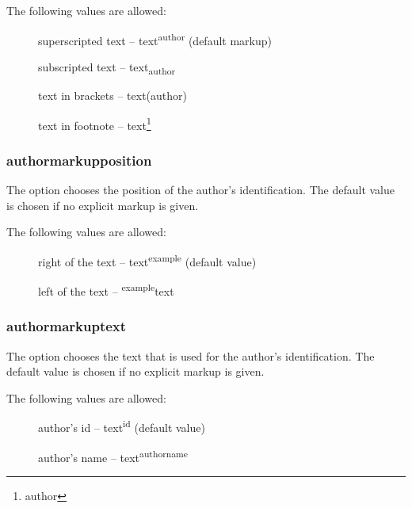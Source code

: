 The following values are allowed:
\begin{description}
	\item [] superscripted text -- text\textsuperscript{author} (default markup)
	\item [] subscripted text -- text\textsubscript{author}
	\item [] text in brackets -- text(author)
	\item [] text in footnote -- text\footnote{author}
\end{description}




\subsubsection{authormarkupposition}

The  option chooses the position of the author's identification.
The default value is chosen if no explicit markup is given.

The following values are allowed:
\begin{description}
	\item [] right of the text -- text\textsuperscript{example} (default value)
	\item [] left of the text -- \textsuperscript{example}text
\end{description}




\subsubsection{authormarkuptext}

The  option chooses the text that is used for the author's identification.
The default value is chosen if no explicit markup is given.

The following values are allowed:
\begin{description}
	\item [] author's id -- text\textsuperscript{id} (default value)
	\item [] author's name -- text\textsuperscript{authorname}
\end{description}




